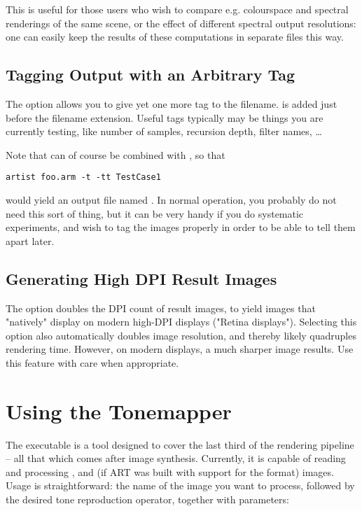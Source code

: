 This is useful for those users who wish to compare e.g. colourspace and spectral renderings of the same scene, or the effect of different spectral output resolutions: one can easily keep the results of these computations in separate files this way. 


\subsection{Tagging Output with an Arbitrary Tag}
The option  allows you to give yet one more tag
to the filename.   is added just before the
filename extension. Useful tags typically may be things you are currently
testing, like number of samples, recursion depth, filter names, \ldots

Note that  can of course be combined with , so that

\begin{verbatim}
artist foo.arm -t -tt TestCase1
\end{verbatim}

would yield an output file named . In normal operation, you probably do not need this sort of thing, but it can be very handy if you \eg do systematic experiments, and wish to tag the images properly in order to be able to tell them apart later.

\subsection{Generating High DPI Result Images}
The option  doubles the DPI count of result images, to yield images that "natively" display on modern high-DPI displays ("Retina displays"). Selecting this option also automatically doubles image resolution, and thereby likely quadruples rendering time. However, on modern displays, a much sharper image results. Use this feature with care when appropriate.

\section{Using the Tonemapper}

The  executable is a tool designed to cover the last third of the rendering pipeline -- all that which comes after image synthesis. Currently, it is capable of reading and processing ,  and (if ART was built with support for the format)  images. Usage is straightforward: the name of the image you want to process, followed by the desired tone reproduction operator, together with parameters:

